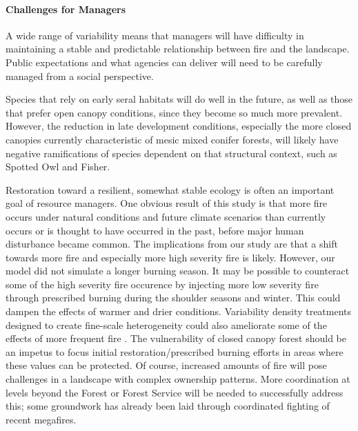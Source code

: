 \paragraph{Challenges for Managers}
A wide range of variability means that managers will have difficulty in maintaining a stable and predictable relationship between fire and the landscape. Public expectations and what agencies can deliver will need to be carefully managed from a social perspective. 

Species that rely on early seral habitats will do well in the future, as well as those that prefer open canopy conditions, since they become so much more prevalent. However, the reduction in late development conditions, especially the more closed canopies currently characteristic of mesic mixed conifer forests, will likely have negative ramifications of species dependent on that structural context, such as Spotted Owl and Fisher.

Restoration toward a resilient, somewhat stable ecology is often an important goal of resource managers. One obvious result of this study is that more fire occurs under natural conditions and future climate scenarios than currently occurs or is thought to have occurred in the past, before major human disturbance became common. The implications from our study are that a shift towards more fire and especially more high severity fire is likely. However, our model did not simulate a longer burning season. It may be possible to counteract some of the high severity fire occurence by injecting more low severity fire through prescribed burning during the shoulder seasons and winter. This could dampen the effects of warmer and drier conditions. Variability density treatments designed to create fine-scale heterogeneity could also ameliorate some of the effects of more frequent fire \citep{Stephens2010,Knapp2012,North2012a}. The vulnerability of closed canopy forest should be an impetus to focus initial restoration/prescribed burning efforts in areas where these values can be protected. Of course, increased amounts of fire will pose challenges in a landscape with complex ownership patterns. More coordination at levels beyond the Forest or Forest Service will be needed to successfully address this; some groundwork has already been laid through coordinated fighting of recent megafires. 

